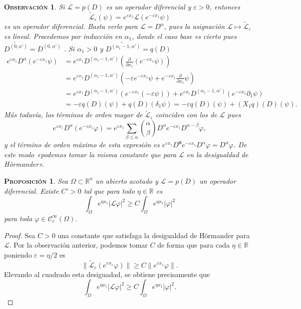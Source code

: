 \documentclass[11pt]{article}
\theoremstyle{colored}
\newtheorem{proposition}{\scshape Proposición}
\newtheorem{remark}{\scshape Observación}
\newcommand{\R}{\mathbb{R}}
\newcommand{\C}{\mathscr{C}}
\newcommand{\eps}{\varepsilon}
\newcommand{\guill}[1]{«#1»}
\renewcommand{\L}{\mathscr{L}}
\begin{document}
\begin{remark} Si $\L = p(D)$ es un operador diferencial y $\eps > 0$, entonces
\[
\widetilde{\L}_\eps(\psi) = e^{\eps x_1}\L(e^{-\eps x_1}\psi)
\]
es un operador diferencial. Basta verlo para $\L = D^\alpha$, pues la asignación $\L \mapsto \widetilde{\L}_\eps$ es lineal. Procedemos por inducción en $\alpha_1$, donde el caso base es cierto pues $\widetilde{D^{(0,\alpha')}} = D^{(0,\alpha')}$ . Si $\alpha_1 > 0$ y $\widetilde{D^{(\alpha_1 - 1, \alpha')}} = q(D)$
\begin{align*}
e^{\eps x_1}D^\alpha(e^{-\eps x_1}\psi) &= e^{\eps x_1}D^{(\alpha_1 - 1, \alpha')}\left(\frac{\partial}{\partial x_1}(e^{-\eps x_1}\psi)\right)\\
&= e^{\eps x_1}D^{(\alpha_1 - 1, \alpha')}\left(-\eps e^{-\eps x_1}\psi + e^{-\eps x_1}\frac{\partial}{\partial x_1}\psi\right)\\
&= e^{\eps x_1}D^{(\alpha_1 - 1, \alpha')}(e^{-\eps x_1}(-\eps\psi)) + e^{\eps x_1}D^{(\alpha_1 - 1, \alpha')}(e^{-\eps x_1}\partial_1\psi)\\
&= -\eps q(D)(\psi) + q(D)(\delta_1\psi) = -\eps q(D)(\psi) + (X_1q)(D)(\psi).
\end{align*}
Más todavía, los términos de orden mayor de $\widetilde{\L}_\eps$ coinciden con los de $\L$ pues
\[
e^{\eps x_1}D^\alpha (e^{-\eps x_1}\varphi) = e^{\eps x_1}\sum_{\beta \leq \alpha}{\alpha \choose \beta}D^\alpha e^{-\eps x_1}D^{\alpha - \beta}\varphi,
\]
y el término de orden máximo de esta expresión es $e^{\eps x_1}D^{\mathbf{0}}e^{-\eps x_1}D^{\alpha}\varphi = D^\alpha\varphi$. De este modo \guill{podemos tomar la misma constante que para $\L$ en la desigualdad de Hörmander}.
\end{remark}

\begin{proposition} \label{sharp-hormander-bound}Sea $\Omega \subset \R^n$ un abierto acotado y $\L = p(D)$ un operador diferencial. Existe $C' > 0$ tal que para todo $\eta \in \R$ es
\[
\int_{\Omega}e^{\eta x_1}|\L \varphi|^2 \geq C \int_{\Omega}e^{\eta x_1}|\varphi|^2
\]
para toda $\varphi \in \C_c^\infty(\Omega)$.
\end{proposition}
\begin{proof} Sea $C > 0$ una constante que satisfaga la desigualdad de Hörmander para $\L$. Por la observación anterior, podemos tomar $C$ de forma que para cada $\eta \in \R$ poniendo $\eps = \eta/2$ es
\[
\|\widetilde{\L}_\eps( e^{\eps x_1}\varphi)\| \geq C \|e^{\eps x_1}\varphi\|.
\]
Elevando al cuadrado esta desiguadad, se obtiene precisamente que
\[
\int_{\Omega}e^{\eta x_1}|\L \varphi|^2 \geq C \int_{\Omega}e^{\eta x_1}|\varphi|^2.
\]
\end{proof}
\end{document}
